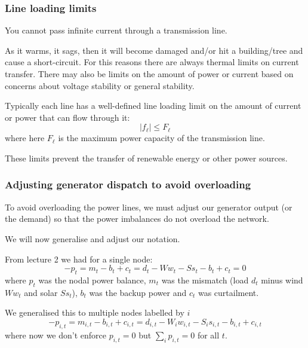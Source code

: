 \documentclass[10pt,aspectratio=169,dvipsnames]{beamer}
\begin{document}
\begin{frame}
  \frametitle{Line loading limits}

  You cannot pass infinite current through a transmission line.

  As it warms, it sags, then it will become damaged and/or hit a
  building/tree and cause a short-circuit. For this reasons there are
  always \alert{thermal limits} on current transfer. There may also be
  limits on the amount of power or current based on concerns about
  \alert{voltage stability} or \alert{general stability}.

  Typically each line has a well-defined \alert{line loading limit} on the
  amount of current or power that can flow through it:
  \begin{equation*}
    | f_{\ell } | \leq F_\ell
  \end{equation*}
  where here $F_\ell$ is the maximum power capacity of the transmission line.

  These limits prevent the transfer of renewable energy or other power sources.

\end{frame}




\begin{frame}
  \frametitle{Adjusting generator dispatch to avoid overloading}

  To avoid overloading the power lines, we must adjust our generator
  output (or the demand) so that the power imbalances do not overload
  the network.

  We will now generalise and adjust our notation.

  From lecture 2 we had for a single node:
  \begin{equation*}
    - p_t = m_t -b_t + c_t = d_t - Ww_t - Ss_t -b_t + c_t = 0
  \end{equation*}
  where $p_t$ was the nodal power balance, $m_t$ was the mismatch
  (load $d_t$ minus wind $Ww_t$ and solar $Ss_t$), $b_t$ was the
  backup power and $c_t$ was curtailment.

  We generalised this to multiple nodes labelled by $i$
  \begin{equation*}
    - p_{i,t} = m_{i,t} -b_{i,t} + c_{i,t} = d_{i,t} - W_iw_{i,t} - S_is_{i,t} -b_{i,t} + c_{i,t}
  \end{equation*}
  where now we don't enforce $p_{i,t} = 0$ but $\sum_{i} p_{i,t} = 0$ for
  all $t$.

\end{frame}
\end{document}
